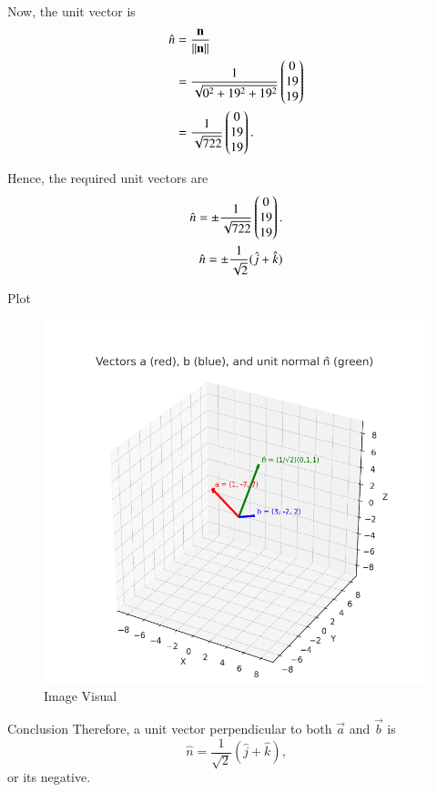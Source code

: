\documentclass{beamer}
\begin{document}
\begin{frame}
Now, the unit vector is
\begin{align}
\hat{n} &= \frac{\mathbf{n}}{\|\mathbf{n}\|} \\
&= \frac{1}{\sqrt{0^2 + 19^2 + 19^2}} \begin{pmatrix}0 \\ 19 \\ 19\end{pmatrix} \\
&= \frac{1}{\sqrt{722}} \begin{pmatrix}0 \\ 19 \\ 19\end{pmatrix}.
\end{align}

Hence, the required unit vectors are
\begin{align}
\hat{n} = \pm \frac{1}{\sqrt{722}} \begin{pmatrix}0 \\ 19 \\ 19\end{pmatrix}.\\
\hat{n} = \pm\frac{1}{\sqrt{2}}(\hat{j} + \hat{k})
\end{align}
\end{frame}
\begin{frame}{Plot}
    \begin{figure}[H]
    \centering
    \includegraphics[width=0.75\columnwidth]{figs/image.png}
    \caption{Image Visual}
    \label{fig:figs/image.png}
    \end{figure}
\end{frame}

\begin{frame}{Conclusion}
    Therefore, a unit vector perpendicular to both $\vec{a}$ and $\vec{b}$ is
\[
\hat{n} = \frac{1}{\sqrt{2}}(\hat{j} + \hat{k}),
\]
or its negative.
\end{frame}
\end{document}
